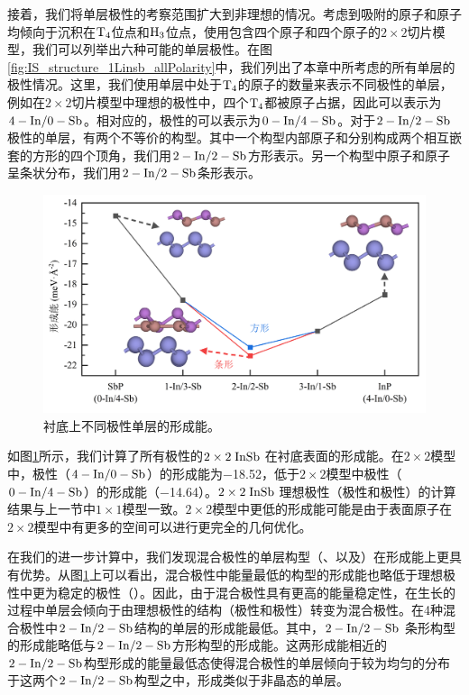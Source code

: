 接着，我们将单层极性的考察范围扩大到非理想的情况。考虑到吸附的原子和原子均倾向于沉积在$\rm T_{4} \it$位点和$\rm H_{3} \it$位点，使用包含四个原子和四个原子的$2 \times 2$切片模型，我们可以列举出六种可能的单层极性。在图\ref{fig:IS_structure_1Linsb_allPolarity}中，我们列出了本章中所考虑的所有单层的极性情况。这里，我们使用单层中处于$\rm T_{4} \it$的原子的数量来表示不同极性的单层，例如在$2 \times 2$切片模型中理想的极性中，四个$\rm T_{4} \it$都被原子占据，因此可以表示为$\rm 4-In/0-Sb$。相对应的，极性的可以表示为$\rm 0-In/4-Sb$。对于$\rm 2-In/2-Sb$极性的单层，有两个不等价的构型。其中一个构型内部原子和分别构成两个相互嵌套的方形的四个顶角，我们用$\rm 2-In/2-Sb$方形表示。另一个构型中原子和原子呈条状分布，我们用$\rm 2-In/2-Sb$条形表示。

\begin{figure}[htb]
    \includegraphics{pic/IS_DFT_1LInSb_all.png}
    \caption{衬底上不同极性单层的形成能。}
    \label{fig:IS_DFT_1LInSb_all}
\end{figure}

如图\ref{fig:IS_DFT_1LInSb_all}所示，我们计算了所有极性的$2 \times 2 \cemb{InSb}$在衬底表面的形成能。在$2 \times 2$模型中，极性（$\rm 4-In/0-Sb$）的形成能为\SI{-18.52}{\mievpas}，低于$2 \times 2$模型中极性（$\rm 0-In/4-Sb$）的形成能（\SI{-14.64}{\mievpas}）。$2 \times 2 \cemb{InSb}$理想极性（极性和极性）的计算结果与上一节中$1 \times 1$模型一致。$2 \times 2$模型中更低的形成能可能是由于表面原子在$2 \times 2$模型中有更多的空间可以进行更完全的几何优化。

在我们的进一步计算中，我们发现混合极性的单层构型（、以及）在形成能上更具有优势。从图\ref{fig:IS_DFT_1LInSb_all}上可以看出，混合极性中能量最低的构型的形成能也略低于理想极性中更为稳定的极性（）。因此，由于混合极性具有更高的能量稳定性，在生长的过程中单层会倾向于由理想极性的结构（极性和极性）转变为混合极性。在4种混合极性中$\rm 2-In/2-Sb$结构的单层的形成能最低。其中，$\rm 2-In/2-Sb$ 条形构型的形成能略低与$\rm 2-In/2-Sb$方形构型的形成能。这两形成能相近的$\rm 2-In/2-Sb$构型形成的能量最低态使得混合极性的单层倾向于较为均匀的分布于这两个$\rm 2-In/2-Sb$构型之中，形成类似于非晶态的单层。

